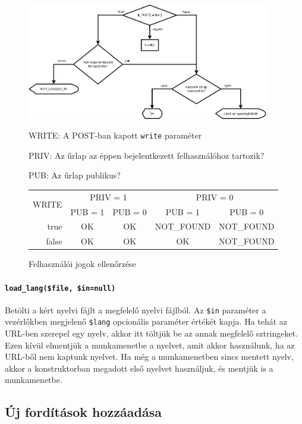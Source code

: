 \documentclass[12pt,a4paper,twoside]{article}
\newcommand{\desc}{
  \begin{description}{}{}
    \setlength\itemsep{0pt}
    \setlength\parskip{0pt}
    \setlength\topsep{0pt}
    \setlength\partopsep{0pt}
    \small}
\newcommand{\ed}{
  \end{description}
}
\begin{document}
\begin{figure}[h]
  \centering
  \includegraphics[width=400px]{rights.png}

  \desc\small
    \item[WRITE:] A POST-ban kapott \texttt{write} paraméter
    \item[PRIV:] Az űrlap az éppen bejelentkezett felhasználóhoz tartozik?
    \item[PUB:] Az űrlap publikus?
  \ed\normalsize

  \begin{tabular*}{\textwidth}{r|cc|cc}
    \multirow{2}{*}{WRITE} & \multicolumn{2}{c|}{PRIV = 1} & \multicolumn{2}{c}{PRIV = 0} \\
    & PUB = 1 & PUB = 0 & PUB = 1 & PUB = 0 \\
    \hline
    true  & OK & OK & NOT\_FOUND & NOT\_FOUND \\
    false & OK & OK & OK         & NOT\_FOUND \\
  \end{tabular*}

  \caption{Felhasználói jogok ellenőrzése}\label{fig:rights}
\end{figure}


\paragraph{\texttt{load\_lang(\$file, \$in=null)}}
Betölti a kért nyelvi fájlt a megfelelő nyelvi fájlból. Az \texttt{\$in}
paraméter a vezérlőkben megjelenő \texttt{\$lang} opcionális paraméter értékét
kapja. Ha tehát az URL-ben szerepel egy nyelv, akkor itt töltjük be az annak
megfelelő sztringeket. Ezen kívül elmentjük a munkamenetbe a nyelvet, amit akkor
használunk, ha az URL-ből nem kaptunk nyelvet. Ha még a munkamenetben sincs
mentett nyelv, akkor a konstruktorban megadott első nyelvet használjuk, és
mentjük is a munkamenetbe.


\subsection{Új fordítások hozzáadása}
\label{sec:manager-i18n}
\end{document}

